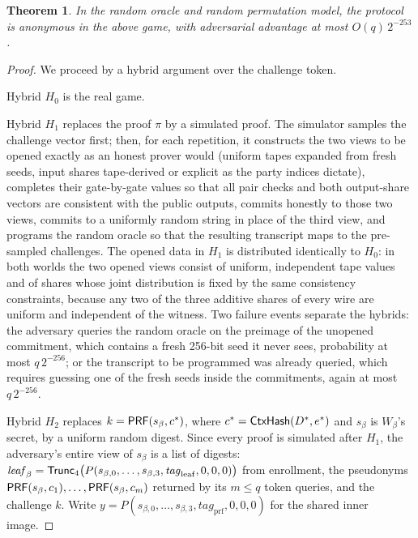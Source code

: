 \documentclass[11pt]{article}
\newtheorem{theorem}{Theorem}
\theoremstyle{definition}
\begin{document}
\begin{theorem}
\label{thm:anon}
In the random oracle and random permutation model, the protocol is anonymous in the above
game, with adversarial advantage at most $O(q)\,2^{-253}$.
\end{theorem}

\begin{proof}
We proceed by a hybrid argument over the challenge token.

Hybrid $H_0$ is the real game.

Hybrid $H_1$ replaces the proof $\pi$ by a simulated proof. The simulator samples the
challenge vector first; then, for each repetition, it constructs the two views to be
opened exactly as an honest prover would (uniform tapes expanded from fresh seeds, input
shares tape-derived or explicit as the party indices dictate), completes their
gate-by-gate values so that all pair checks and both output-share vectors are consistent
with the public outputs, commits honestly to those two views, commits to a uniformly
random string in place of the third view, and programs the random oracle so that the
resulting transcript maps to the pre-sampled challenges. The opened data in $H_1$ is
distributed identically to $H_0$: in both worlds the two opened views consist of uniform,
independent tape values and of shares whose joint distribution is fixed by the same
consistency constraints, because any two of the three additive shares of every wire are
uniform and independent of the witness. Two failure events separate the hybrids: the
adversary queries the random oracle on the preimage of the unopened commitment, which
contains a fresh 256-bit seed it never sees, probability at most $q\,2^{-256}$; or the
transcript to be programmed was already queried, which requires guessing one of the fresh
seeds inside the commitments, again at most $q\,2^{-256}$.

Hybrid $H_2$ replaces $k = \mathsf{PRF}(s_\beta, c^*)$, where $c^* = \mathsf{CtxHash}(D^*, e^*)$ and
$s_\beta$ is $W_\beta$'s secret, by a uniform random digest. Since every proof is
simulated after $H_1$, the adversary's entire view of $s_\beta$ is a list of digests:
$\mathit{leaf}_\beta = \mathsf{Trunc}_4\bigl(P(s_{\beta,0}, \ldots, s_{\beta,3},
\mathit{tag}_{\mathrm{leaf}}, 0, 0, 0)\bigr)$ from enrollment, the pseudonyms
$\mathsf{PRF}(s_\beta, c_1), \ldots, \mathsf{PRF}(s_\beta, c_m)$ returned by its $m \le q$ token queries,
and the challenge $k$. Write $y = P(s_{\beta,0}, \ldots, s_{\beta,3},
\mathit{tag}_{\mathrm{prf}}, 0, 0, 0)$ for the shared inner image.


\end{proof}
\end{document}
